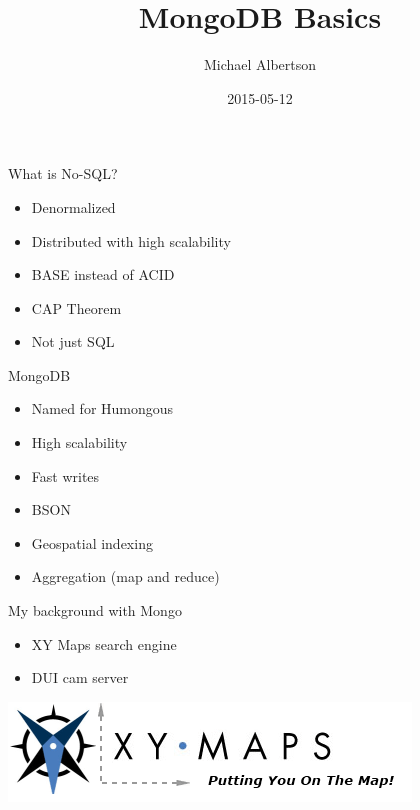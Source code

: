 \documentclass{beamer}
\title{MongoDB Basics}
\author{Michael Albertson}
\date{2015-05-12}
\begin{document}
\begin{frame}

\maketitle

\end{frame}


\begin{frame}{What is No-SQL?}

\begin{itemize}
\item Denormalized
\item Distributed with high scalability
\item BASE instead of ACID %
\item CAP Theorem
\item Not just SQL
\end{itemize}

\end{frame}


\begin{frame}{MongoDB}

\begin{itemize}
\item Named for Humongous
\item High scalability
\item Fast writes
\item BSON
\item Geospatial indexing
\item Aggregation (map and reduce)
\end{itemize}

\end{frame}


\begin{frame}{My background with Mongo}

\begin{itemize}
\item XY Maps search engine
\item DUI cam server
\end{itemize}

\begin{center}
\includegraphics[scale=.5]{xy-logo.png}
\end{center}

\end{frame}
\end{document}
